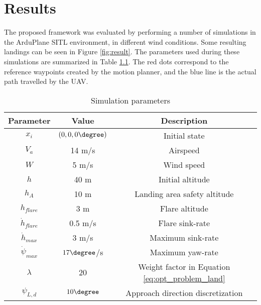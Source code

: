 \chapter{Results}\label{cha:results}
The proposed framework was evaluated by performing a number of simulations in the ArduPlane SITL environment, in different wind conditions. 
Some resulting landings can be seen in Figure \ref{fig:result}. The parameters used during these simulations are summarized in Table \ref{tab:sim_params}.
The red dots correspond to the reference waypoints created by the motion planner, and the blue line is the actual path travelled by the UAV.

\begin{table}[H]
    \begin{center}
        \begin{tabular}{|c|c|c|}
            \hline
            \textbf{Parameter} & \textbf{Value} & \textbf{Description}\\
            \hline
            $x_i$ & $(0,0,0\degree)$ & Initial state \\
            \hline
            $V_a$ & 14 m/s & Airspeed \\
            \hline
            $W$ & 5 m/s & Wind speed \\
            \hline
            $h$ & 40 m & Initial altitude \\
            \hline
            $h_A$ & 10 m & Landing area safety altitude \\
            \hline
            $h_{flare}$ & 3 m & Flare altitude \\
            \hline
            $\dot{h}_{flare}$ & 0.5 m/s & Flare sink-rate\\
            \hline
            $\dot{h}_{max}$ & 3 m/s & Maximum sink-rate \\
            \hline
            $\dot{\psi}_{max}$ & $17\degree$/s & Maximum yaw-rate\\
            \hline
            $\lambda$ & 20 & Weight factor in Equation \eqref{eq:opt_problem_land} \\
            \hline
            $\psi_{L,d}$ & $10\degree$ & Approach direction discretization \\
            \hline
        \end{tabular}        
    \end{center}
    \caption{Simulation parameters}
    \label{tab:sim_params}
\end{table}

